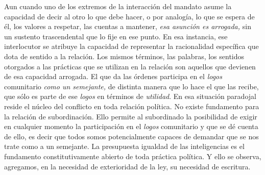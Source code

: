 Aun cuando uno de los extremos de la interacción del mandato asume la capacidad de decir al otro lo que debe hacer, o por analogía, lo que se espera de él, los valores a respetar, las cuentas a mantener, \emph{esa asunción es arrogada,} sin un sustento trascendental que lo fije en ese punto. En esa instancia, ese interlocutor se atribuye la capacidad de representar la racionalidad específica que dota de sentido a la relación. Los mismos términos, las palabras, los sentidos otorgados a las prácticas que se utilizan en la relación son aquellos que devienen de esa capacidad arrogada. El que da las órdenes participa en el \emph{logos} comunitario \emph{como un semejante,} de distinta manera que lo hace el que las recibe, que sólo es parte de ese \emph{logos} en términos de \emph{utilidad}. En esa situación paradojal reside el núcleo del conflicto en toda relación política. No existe fundamento para la relación de subordinación. Ello permite al subordinado la posibilidad de exigir en cualquier momento la participación en el \emph{logos} comunitario y que se dé cuenta de ello, es decir que todos somos potencialmente capaces de demandar que se nos trate como a un semejante. La presupuesta igualdad de las inteligencias es el fundamento constitutivamente abierto de toda práctica política. Y ello se observa, agregamos, en la necesidad de exterioridad de la ley, su necesidad de escritura.

